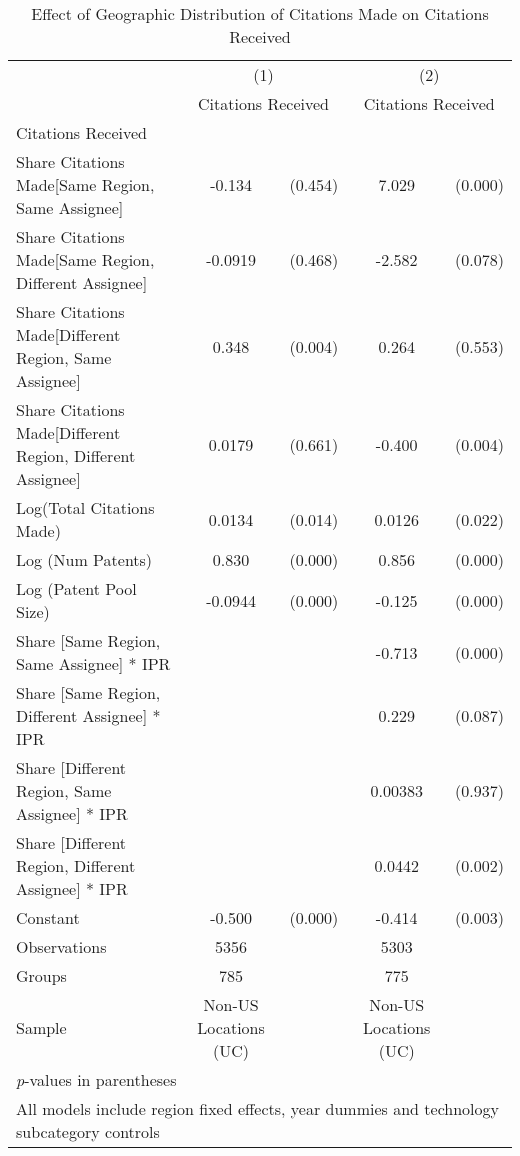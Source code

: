 {
\begin{longtable}{l*{2}{cc}}
\caption{Effect of Geographic Distribution of Citations Made on Citations Received \label{model36}}\\
\hline\hline\endfirsthead\hline\endhead\hline\endfoot\endlastfoot
                &\multicolumn{2}{c}{(1)}&\multicolumn{2}{c}{(2)}\\
                &\multicolumn{2}{c}{Citations Received}&\multicolumn{2}{c}{Citations Received}\\
\hline
Citations Received&         &         &         &         \\
Share Citations Made[Same Region, Same Assignee]&   -0.134&  (0.454)&    7.029&  (0.000)\\
Share Citations Made[Same Region, Different Assignee]&  -0.0919&  (0.468)&   -2.582&  (0.078)\\
Share Citations Made[Different Region, Same Assignee]&    0.348&  (0.004)&    0.264&  (0.553)\\
Share Citations Made[Different Region, Different Assignee]&   0.0179&  (0.661)&   -0.400&  (0.004)\\
Log(Total Citations Made)&   0.0134&  (0.014)&   0.0126&  (0.022)\\
Log (Num Patents)&    0.830&  (0.000)&    0.856&  (0.000)\\
Log (Patent Pool Size)&  -0.0944&  (0.000)&   -0.125&  (0.000)\\
Share [Same Region, Same Assignee] * IPR&         &         &   -0.713&  (0.000)\\
Share [Same Region, Different Assignee] * IPR&         &         &    0.229&  (0.087)\\
Share [Different Region, Same Assignee] * IPR&         &         &  0.00383&  (0.937)\\
Share [Different Region, Different Assignee] * IPR&         &         &   0.0442&  (0.002)\\
Constant        &   -0.500&  (0.000)&   -0.414&  (0.003)\\
\hline
Observations    &     5356&         &     5303&         \\
Groups          &      785&         &      775&         \\
Sample          &Non-US Locations (UC)&         &Non-US Locations (UC)&         \\
\hline\hline
\multicolumn{5}{l}{\footnotesize \textit{p}-values in parentheses}\\
\multicolumn{5}{l}{\footnotesize All models include region fixed effects, year dummies and technology subcategory controls}\\
\end{longtable}
}
